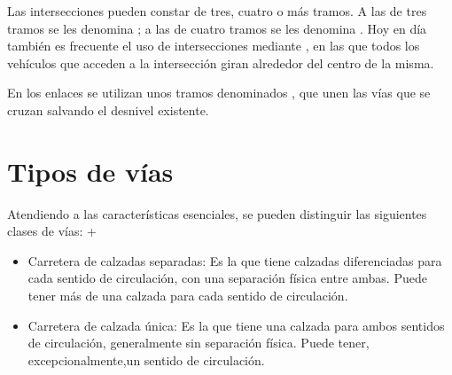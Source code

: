 \documentclass[letterpaper,10pt,english]{sphinxmanual}
\begin{document}
Las intersecciones pueden constar de tres, cuatro o más tramos. A las de tres tramos se les denomina ; a las de cuatro tramos se les denomina . Hoy en día también es frecuente el uso de intersecciones mediante , en las que todos los vehículos que acceden a la intersección giran alrededor del centro de la misma.

En los enlaces se utilizan unos tramos denominados , que unen las vías que se cruzan salvando el desnivel existente.


\section{Tipos de vías}
\label{\detokenize{trazado:tipos-de-vias}}
Atendiendo a las características esenciales, se pueden distinguir las siguientes clases de vías:
+ 
\begin{itemize}
\item {} 
Carretera de calzadas separadas: Es la que tiene calzadas diferenciadas para cada sentido de circulación, con una separación física entre ambas. Puede tener más de una calzada para cada sentido de circulación.

\item {} 
Carretera de calzada única: Es la que tiene una calzada para ambos sentidos de circulación, generalmente sin separación física. Puede tener, excepcionalmente,un sentido de circulación.

\end{itemize}
\end{document}
